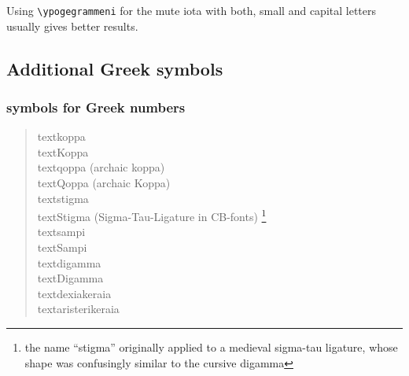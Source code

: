 \documentclass[a4paper]{article}
\begin{document}
Using \verb|\ypogegrammeni| for the mute iota with both, small and capital
letters usually gives better results.


\subsection{Additional Greek symbols}

\subsubsection{symbols for Greek numbers}

\begin{quote}
\raggedright
\textkoppa{}      textkoppa                 \\ %
\textKoppa{}      textKoppa                 \\ %
\textqoppa{}      textqoppa (archaic koppa) \\ %
\textQoppa{}      textQoppa (archaic Koppa) \\ %
\textstigma{}     textstigma                \\ %
\textStigma{}     textStigma (Sigma-Tau-Ligature in CB-fonts)%
\footnote{the name ``stigma'' originally applied to a medieval sigma-tau
         ligature, whose shape was confusingly similar to the cursive
         digamma} \\ %
\textsampi{}      textsampi  \\ %
\textSampi{}      textSampi  \\ %
\textdigamma{}    textdigamma  \\ %
\textDigamma{}    textDigamma  \\ %
\textdexiakeraia{}    textdexiakeraia  \\ %
\textaristerikeraia{} textaristerikeraia \\ %
\end{quote}

%
\end{document}
